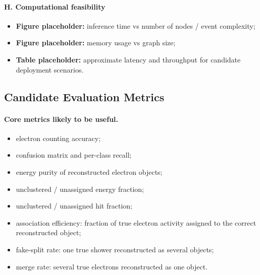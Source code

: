 \paragraph{H. Computational feasibility}
\begin{itemize}
    \item \textbf{Figure placeholder:} inference time vs number of nodes / event complexity;
    \item \textbf{Figure placeholder:} memory usage vs graph size;
    \item \textbf{Table placeholder:} approximate latency and throughput for candidate deployment scenarios.
\end{itemize}

\subsection{Candidate Evaluation Metrics}

\paragraph{Core metrics likely to be useful.}
\begin{itemize}
    \item electron counting accuracy;
    \item confusion matrix and per-class recall;
    \item energy purity of reconstructed electron objects;
    \item unclustered / unassigned energy fraction;
    \item unclustered / unassigned hit fraction;
    \item association efficiency: fraction of true electron activity assigned to the correct reconstructed object;
    \item fake-split rate: one true shower reconstructed as several objects;
    \item merge rate: several true electrons reconstructed as one object.
\end{itemize}

